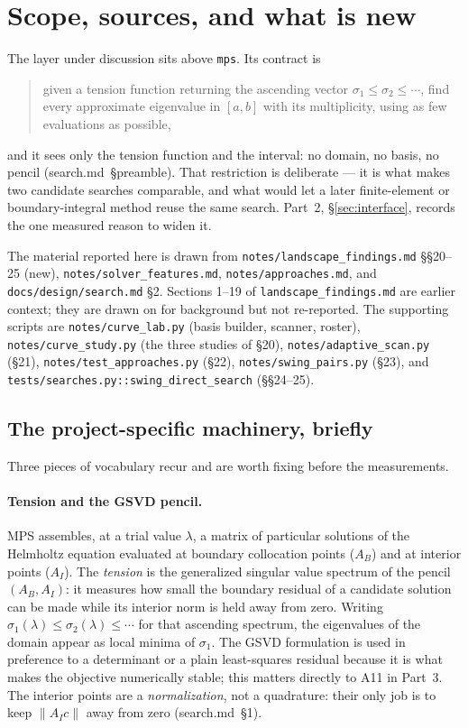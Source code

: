 \documentclass[11pt]{article}
\newcommand{\file}[1]{\texttt{#1}}
\newcommand{\sm}[1]{(search.md~\S#1)}
\newcommand{\sig}{\sigma}
\newcommand{\sione}{\sig_1}
\newcommand{\sitwo}{\sig_2}
\newcommand{\lam}{\lambda}
\begin{document}
\tableofcontents

\newpage

\section{Scope, sources, and what is new}

The layer under discussion sits above \file{mps}. Its contract is
\begin{quote}
given a tension function returning the ascending vector
$\sione \le \sitwo \le \cdots$, find every approximate eigenvalue in $[a,b]$ with its
multiplicity, using as few evaluations as possible,
\end{quote}
and it sees only the tension function and the interval: no domain, no basis, no pencil
\sm{preamble}. That restriction is deliberate --- it is what makes two candidate searches
comparable, and what would let a later finite-element or boundary-integral method reuse the
same search. Part~2, \S\ref{sec:interface}, records the one measured reason to widen it.

The material reported here is drawn from
\file{notes/landscape\_findings.md} \S\S20--25 (new),
\file{notes/solver\_features.md},
\file{notes/approaches.md}, and
\file{docs/design/search.md} \S2. Sections 1--19 of \file{landscape\_findings.md} are earlier
context; they are drawn on for background but not re-reported. The supporting scripts are
\file{notes/curve\_lab.py} (basis builder, scanner, roster),
\file{notes/curve\_study.py} (the three studies of \S20),
\file{notes/adaptive\_scan.py} (\S21),
\file{notes/test\_approaches.py} (\S22),
\file{notes/swing\_pairs.py} (\S23), and
\file{tests/searches.py::swing\_direct\_search} (\S\S24--25).

\subsection{The project-specific machinery, briefly}

Three pieces of vocabulary recur and are worth fixing before the measurements.

\paragraph{Tension and the GSVD pencil.}
MPS assembles, at a trial value $\lam$, a matrix of particular solutions of the Helmholtz
equation evaluated at boundary collocation points ($A_B$) and at interior points ($A_I$). The
\emph{tension} is the generalized singular value spectrum of the pencil $(A_B, A_I)$: it
measures how small the boundary residual of a candidate solution can be made while its
interior norm is held away from zero. Writing $\sione(\lam) \le \sitwo(\lam) \le \cdots$ for
that ascending spectrum, the eigenvalues of the domain appear as local minima of $\sione$. The
GSVD formulation is used in preference to a determinant or a plain least-squares residual
because it is what makes the objective numerically stable; this matters directly to A11 in
Part~3. The interior points are a \emph{normalization}, not a quadrature: their only job is to
keep $\|A_I c\|$ away from zero \sm{1}.
\end{document}
